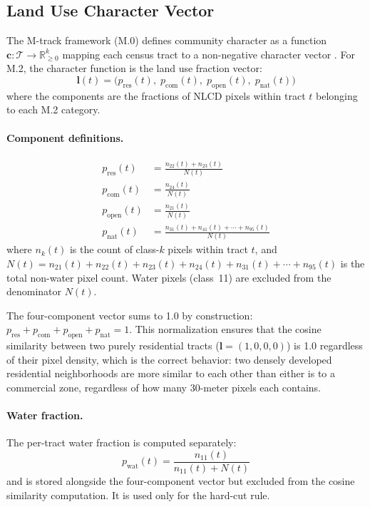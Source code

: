 \label{sec:algorithm}

\subsection{Land Use Character Vector}

The M-track framework (M.0) defines community character as a function
$\mathbf{c}: \mathcal{T} \to \mathbb{R}^k_{\geq 0}$ mapping each census
tract to a non-negative character vector \citep{m0framework}.
For M.2, the character function is the land use fraction vector:
\begin{equation}
  \mathbf{l}(t) = \bigl(
    p_{\mathrm{res}}(t),\;
    p_{\mathrm{com}}(t),\;
    p_{\mathrm{open}}(t),\;
    p_{\mathrm{nat}}(t)
  \bigr)
  \label{eq:landuse}
\end{equation}
where the components are the fractions of NLCD pixels within tract $t$
belonging to each M.2 category.

\paragraph{Component definitions.}
\begin{align}
  p_{\mathrm{res}}(t)  &= \frac{n_{22}(t) + n_{23}(t)}{N(t)} \\
  p_{\mathrm{com}}(t)  &= \frac{n_{24}(t)}{N(t)} \\
  p_{\mathrm{open}}(t) &= \frac{n_{21}(t)}{N(t)} \\
  p_{\mathrm{nat}}(t)  &= \frac{n_{31}(t) + n_{41}(t) + \cdots + n_{95}(t)}{N(t)}
\end{align}
where $n_k(t)$ is the count of class-$k$ pixels within tract $t$,
and $N(t) = n_{21}(t) + n_{22}(t) + n_{23}(t) + n_{24}(t) + n_{31}(t) + \cdots + n_{95}(t)$
is the total non-water pixel count.
Water pixels (class~11) are excluded from the denominator $N(t)$.

The four-component vector sums to 1.0 by construction:
$p_{\mathrm{res}} + p_{\mathrm{com}} + p_{\mathrm{open}} + p_{\mathrm{nat}} = 1$.
This normalization ensures that the cosine similarity between two purely
residential tracts ($\mathbf{l} = (1, 0, 0, 0)$) is 1.0 regardless of
their pixel density, which is the correct behavior: two densely developed
residential neighborhoods are more similar to each other than either is
to a commercial zone, regardless of how many 30-meter pixels each contains.

\paragraph{Water fraction.}
The per-tract water fraction is computed separately:
\begin{equation}
  p_{\mathrm{wat}}(t) = \frac{n_{11}(t)}{n_{11}(t) + N(t)}
  \label{eq:waterfrac}
\end{equation}
and is stored alongside the four-component vector but excluded from the
cosine similarity computation.
It is used only for the hard-cut rule.

